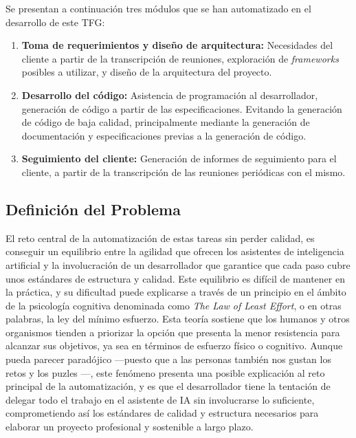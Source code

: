 \documentclass[11pt, letterpaper]{article}
\begin{document}
Se presentan a continuación tres módulos que se han automatizado en el desarrollo de este TFG:
\begin{enumerate}
    \item \textbf{Toma de requerimientos y diseño de arquitectura:} Necesidades del cliente a partir de la transcripción de reuniones, exploración de \textit{frameworks} posibles a utilizar, y diseño de la arquitectura del proyecto.
    \item \textbf{Desarrollo del código:} Asistencia de programación al desarrollador, generación de código a partir de las especificaciones. Evitando la generación de código de baja calidad, principalmente mediante la generación de documentación y especificaciones previas a la generación de código.
    \item \textbf{Seguimiento del cliente:} Generación de informes de seguimiento para el cliente, a partir de la transcripción de las reuniones periódicas con el mismo.
\end{enumerate}

\subsection{Definición del Problema}
\label{sec:definicion_problema}

El reto central de la automatización de estas tareas sin perder calidad, es conseguir un equilibrio entre la agilidad que ofrecen los asistentes de inteligencia artificial y la involucración de un desarrollador que garantice que cada paso cubre unos estándares de estructura y calidad. Este equilibrio es difícil de mantener en la práctica, y su dificultad puede explicarse a través de un principio en el ámbito de la psicología cognitiva denominada como \textit{The Law of Least Effort}, o en otras palabras, la ley del mínimo esfuerzo. Esta teoría sostiene que los humanos y otros organismos tienden a priorizar la opción que presenta la menor resistencia para alcanzar sus objetivos, ya sea en términos de esfuerzo físico o cognitivo\cite{avoidance_of_cognitive_demand}. Aunque pueda parecer paradójico ---puesto que a las personas también nos gustan los retos y los puzles \cite{inzlicht_effort_paradox_2018}---, este fenómeno presenta una posible explicación al reto principal de la automatización, y es que el desarrollador tiene la tentación de delegar todo el trabajo en el asistente de IA sin involucrarse lo suficiente, comprometiendo así los estándares de calidad y estructura necesarios para elaborar un proyecto profesional y sostenible a largo plazo.
\end{document}
